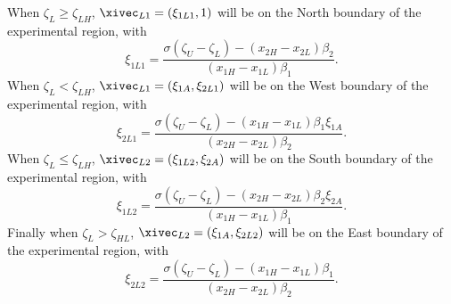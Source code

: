 When $\zeta_{L} \ge \zeta_{LH}$, 
$\xivec_{L1}=(\xi_{1L1},1)$ will be on the North boundary
of the experimental region,
with
\begin{equation}
\label{equation:north.boundary}
\xi_{1L1}=\frac{
\sigma (\zeta_{U}-\zeta_{L}) -(x_{2H}-x_{2L})\beta_{2} 
               }
               {
(x_{1H}-x_{1L})\beta_{1} 
               }.
\end{equation}
When $\zeta_{L} < \zeta_{LH}$, $\xivec_{L1}=(\xi_{1A}, \xi_{2L1})$
will be on the West boundary of the experimental region, with
\begin{equation}
\label{equation:west.boundary}
\xi_{2L1}=\frac{
\sigma (\zeta_{U}-\zeta_{L}) -(x_{1H}-x_{1L})\beta_{1} \xi_{1A}
               }
               {
(x_{2H}-x_{2L})\beta_{2} 
               }.
\end{equation}
When $\zeta_{L} \le  \zeta_{LH}$, 
$\xivec_{L2}=(\xi_{1L2}, \xi_{2A})$ will be on the South boundary
of the experimental region, with
\begin{equation}
\label{equation:south.boundary}
\xi_{1L2}=
\frac{
\sigma (\zeta_{U}-\zeta_{L}) -(x_{2H}-x_{2L})\beta_{2} \xi_{2A}
               }
               {
(x_{1H}-x_{1L})\beta_{1} 
               }.
\end{equation}
Finally when $\zeta_{L} > \zeta_{HL}$, $\xivec_{L2}=(\xi_{1A}, \xi_{2L2})$
will be on the East boundary of the experimental region, with
\begin{equation}
\label{equation:east.boundary}
\xi_{2L2}=\frac{
\sigma (\zeta_{U}-\zeta_{L}) -(x_{1H}-x_{1L})\beta_{1}
               }
               {
(x_{2H}-x_{2L})\beta_{2} 
               }.
\end{equation}

